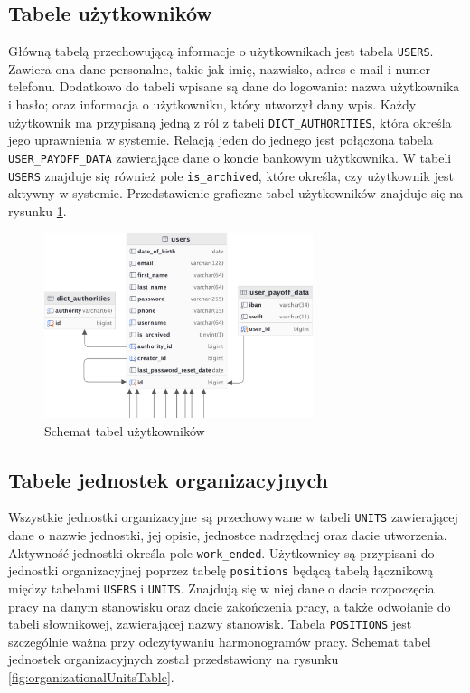 \subsection{Tabele użytkowników}

Główną tabelą przechowującą informacje o użytkownikach jest tabela \texttt{USERS}. Zawiera ona dane personalne, takie jak imię, nazwisko, adres e-mail i numer telefonu. Dodatkowo do tabeli wpisane są dane do logowania: nazwa użytkownika i hasło; oraz informacja o użytkowniku, który utworzył dany wpis. Każdy użytkownik ma przypisaną jedną z ról z tabeli \texttt{DICT\_AUTHORITIES}, która określa jego uprawnienia w systemie. Relacją jeden do jednego jest połączona tabela \texttt{USER\_PAYOFF\_DATA} zawierające dane o koncie bankowym użytkownika. W tabeli \texttt{USERS} znajduje się również pole \texttt{is\_archived}, które określa, czy użytkownik jest aktywny w systemie. Przedstawienie graficzne tabel użytkowników znajduje się na rysunku \ref{fig:usersTable}.

\begin{figure}[H]
    \centering
    \includegraphics[width=0.7\textwidth]{graf/usersTable.png}
    \caption{Schemat tabel użytkowników}
    \label{fig:usersTable}
\end{figure}

\subsection{Tabele jednostek organizacyjnych}

Wszystkie jednostki organizacyjne są przechowywane w tabeli \texttt{UNITS} zawierającej dane o nazwie jednostki, jej opisie, jednostce nadrzędnej oraz dacie utworzenia. Aktywność jednostki określa pole \texttt{work\_ended}. Użytkownicy są przypisani do jednostki organizacyjnej poprzez tabelę \texttt{positions} będącą tabelą łącznikową między tabelami \texttt{USERS} i \texttt{UNITS}. Znajdują się w niej dane o dacie rozpoczęcia pracy na danym stanowisku oraz dacie zakończenia pracy, a także odwołanie do tabeli słownikowej, zawierającej nazwy stanowisk. Tabela \texttt{POSITIONS} jest szczególnie ważna przy odczytywaniu harmonogramów pracy. Schemat tabel jednostek organizacyjnych został przedstawiony na rysunku \ref{fig:organizationalUnitsTable}.

